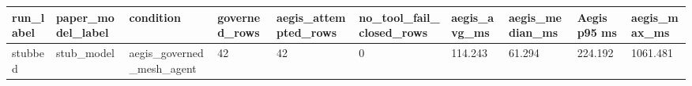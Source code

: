 \begin{tabular}{llllllllll}
 \hline
run\_label & paper\_model\_label & condition & governed\_rows & aegis\_attempted\_rows & no\_tool\_fail\_closed\_rows & aegis\_avg\_ms & aegis\_median\_ms & Aegis p95 ms & aegis\_max\_ms \\
 \hline
stubbed & stub\_model & aegis\_governed\_mesh\_agent & 42 & 42 & 0 & 114.243 & 61.294 & 224.192 & 1061.481 \\
 \hline
\end{tabular}
